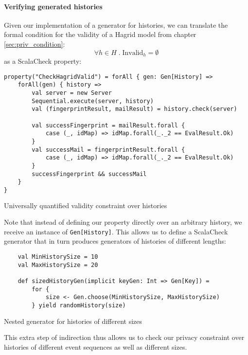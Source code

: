 \paragraph{Verifying generated histories}
Given our implementation of a generator for histories, we can translate the formal condition for the validity of a Hagrid model from chapter \ref{sec:priv_condition}:
\[
    \forall h \in H \; .\; \text{Invalid}_h = \emptyset
\]
as a ScalaCheck property:
\begin{code}
    \begin{verbatim}
property("CheckHagridValid") = forAll { gen: Gen[History] =>
    forAll(gen) { history =>
        val server = new Server
        Sequential.execute(server, history)
        val (fingerprintResult, mailResult) = history.check(server)

        val successFingerprint = mailResult.forall {
            case (_, idMap) => idMap.forall(_._2 == EvalResult.Ok)
        }
        val successMail = fingerprintResult.forall {
            case (_, idMap) => idMap.forall(_._2 == EvalResult.Ok)
        }
        successFingerprint && successMail
    }
}
    \end{verbatim}
    \caption{Universally quantified validity constraint over histories}
\end{code}

Note that instead of defining our property directly over an arbitrary history, we receive an instance of \texttt{Gen[History]}. This allows us to define a ScalaCheck generator that in turn produces generators of histories of different lengths: 
\begin{code}
    \begin{verbatim}
    val MinHistorySize = 10
    val MaxHistorySize = 20

    def sizedHistoryGen(implicit keyGen: Int => Gen[Key]) =
        for {
            size <- Gen.choose(MinHistorySize, MaxHistorySize)
        } yield randomHistory(size)
    \end{verbatim}
    \caption{Nested generator for histories of different sizes}
\end{code}

This extra step of indirection thus allows us to check our privacy constraint over histories of different event sequences as well as different sizes.

